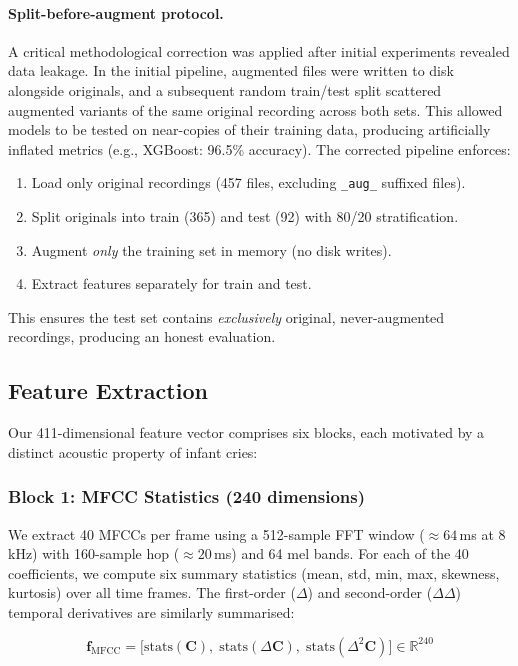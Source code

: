 \documentclass[11pt,a4paper]{article}
\begin{document}
\paragraph{Split-before-augment protocol.}
A critical methodological correction was applied after initial
experiments revealed data leakage. In the initial pipeline,
augmented files were written to disk alongside originals, and a
subsequent random train/test split scattered augmented variants of the
same original recording across both sets. This allowed models to be
tested on near-copies of their training data, producing artificially
inflated metrics (e.g., XGBoost: 96.5\% accuracy). The corrected
pipeline enforces:
\begin{enumerate}[nosep]
  \item Load only original recordings (457 files, excluding
        \texttt{\_aug\_} suffixed files).
  \item Split originals into train (365) and test (92) with 80/20
        stratification.
  \item Augment \textit{only} the training set in memory (no disk
        writes).
  \item Extract features separately for train and test.
\end{enumerate}
This ensures the test set contains \textit{exclusively} original,
never-augmented recordings, producing an honest evaluation.

\subsection{Feature Extraction}
\label{sec:features}

Our 411-dimensional feature vector comprises six blocks, each motivated
by a distinct acoustic property of infant cries:

\subsubsection{Block 1: MFCC Statistics (240 dimensions)}

We extract 40 MFCCs per frame using a 512-sample FFT window
($\approx 64$\,ms at 8\,kHz) with 160-sample hop ($\approx 20$\,ms)
and 64 mel bands. For each of the 40 coefficients, we compute six
summary statistics (mean, std, min, max, skewness, kurtosis) over all
time frames. The first-order ($\Delta$) and second-order
($\Delta\Delta$) temporal derivatives are similarly summarised:

\begin{equation}
  \mathbf{f}_{\text{MFCC}} = \bigl[
    \text{stats}(\mathbf{C}), \;
    \text{stats}(\Delta\mathbf{C}), \;
    \text{stats}(\Delta^2\mathbf{C})
  \bigr] \in \mathbb{R}^{240}
\end{equation}
\end{document}
